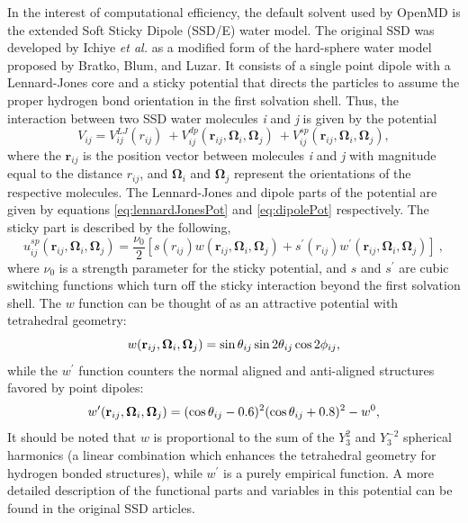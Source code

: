 \documentclass[]{book}
\begin{document}
In the interest of computational efficiency, the default solvent used
by {\sc OpenMD} is the extended Soft Sticky Dipole (SSD/E) water
model.\cite{fennell04} The original SSD was developed by Ichiye
\emph{et al.}\cite{liu96:new_model} as a modified form of the hard-sphere 
water model proposed by Bratko, Blum, and
Luzar.\cite{Bratko85,Bratko95} It consists of a single point dipole
with a Lennard-Jones core and a sticky potential that directs the
particles to assume the proper hydrogen bond orientation in the first
solvation shell. Thus, the interaction between two SSD water molecules
\emph{i} and \emph{j} is given by the potential
\begin{equation}
V_{ij} = 
	V_{ij}^{LJ} (r_{ij})\ + V_{ij}^{dp}
	(\mathbf{r}_{ij},\boldsymbol{\Omega}_i,\boldsymbol{\Omega}_j)\ +
	V_{ij}^{sp}
	(\mathbf{r}_{ij},\boldsymbol{\Omega}_i,\boldsymbol{\Omega}_j),
\label{eq:ssdPot}
\end{equation}
where the $\mathbf{r}_{ij}$ is the position vector between molecules
\emph{i} and \emph{j} with magnitude equal to the distance $r_{ij}$, and
$\boldsymbol{\Omega}_i$ and $\boldsymbol{\Omega}_j$ represent the
orientations of the respective molecules. The Lennard-Jones and dipole
parts of the potential are given by equations \ref{eq:lennardJonesPot}
and \ref{eq:dipolePot} respectively. The sticky part is described by
the following,
\begin{equation}
u_{ij}^{sp}(\mathbf{r}_{ij},\boldsymbol{\Omega}_i,\boldsymbol{\Omega}_j)=
	\frac{\nu_0}{2}[s(r_{ij})w(\mathbf{r}_{ij},
	\boldsymbol{\Omega}_i,\boldsymbol{\Omega}_j) +
	s^\prime(r_{ij})w^\prime(\mathbf{r}_{ij},
	\boldsymbol{\Omega}_i,\boldsymbol{\Omega}_j)]\ ,
\label{eq:stickyPot}
\end{equation}
where $\nu_0$ is a strength parameter for the sticky potential, and
$s$ and $s^\prime$ are cubic switching functions which turn off the
sticky interaction beyond the first solvation shell. The $w$ function
can be thought of as an attractive potential with tetrahedral
geometry:
\begin{equation}
w({\bf r}_{ij},{\bf \Omega}_i,{\bf \Omega}_j)=
	\sin\theta_{ij}\sin2\theta_{ij}\cos2\phi_{ij},
\label{eq:stickyW}
\end{equation}
while the $w^\prime$ function counters the normal aligned and
anti-aligned structures favored by point dipoles:
\begin{equation}
w^\prime({\bf r}_{ij},{\bf \Omega}_i,{\bf \Omega}_j)=
	(\cos\theta_{ij}-0.6)^2(\cos\theta_{ij}+0.8)^2-w^0,
\label{eq:stickyWprime}
\end{equation}
It should be noted that $w$ is proportional to the sum of the $Y_3^2$
and $Y_3^{-2}$ spherical harmonics (a linear combination which
enhances the tetrahedral geometry for hydrogen bonded structures),
while $w^\prime$ is a purely empirical function.  A more detailed
description of the functional parts and variables in this potential
can be found in the original SSD
articles.\cite{liu96:new_model,liu96:monte_carlo,chandra99:ssd_md,Ichiye03}
\end{document}
